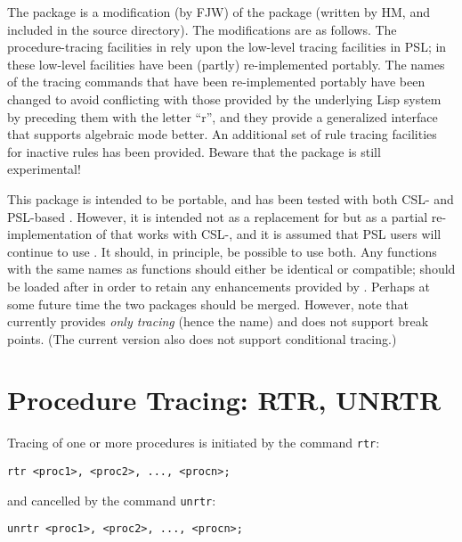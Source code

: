 The \rtrace{} package is a modification (by FJW) of the \rdebug{}
package (written by HM, and included in the \rtrace{} source
directory).  The modifications are as follows.  The procedure-tracing
facilities in \rdebug{} rely upon the low-level tracing facilities in
PSL; in \rtrace{} these low-level facilities have been (partly)
re-implemented portably.  The names of the tracing commands that have
been re-implemented portably have been changed to avoid conflicting
with those provided by the underlying Lisp system by preceding them
with the letter ``r'', and they provide a generalized interface that
supports algebraic mode better.  An additional set of rule tracing
facilities for inactive rules has been provided.  Beware that the
\rtrace{} package is still experimental!

This package is intended to be portable, and has been tested with both
CSL- and PSL-based \REDUCE{}.  However, it is intended not as a
replacement for \rdebug{} but as a partial re-implementation of
\rdebug{} that works with CSL-\REDUCE{}, and it is assumed that PSL
users will continue to use \rdebug{}.  It should, in principle, be
possible to use both.  Any \rtrace{} functions with the same names as
\rdebug{} functions should either be identical or compatible;
\rtrace{} should be loaded after \rdebug{} in order to retain any
enhancements provided by \rtrace{}.  Perhaps at some future time the
two packages should be merged.  However, note that \rtrace{} currently
provides \emph{only tracing} (hence the name) and does not support
break points.  (The current version also does not support conditional
tracing.)

\section{Procedure Tracing: RTR, UNRTR}

\hypertarget{command:RTR}{}
\hypertarget{command:UNRTR}{}
Tracing of one or more procedures is initiated by the command
\texttt{rtr}:
\begin{verbatim}
rtr <proc1>, <proc2>, ..., <procn>;
\end{verbatim}
and cancelled by the command \texttt{unrtr}:
\begin{verbatim}
unrtr <proc1>, <proc2>, ..., <procn>;
\end{verbatim}

